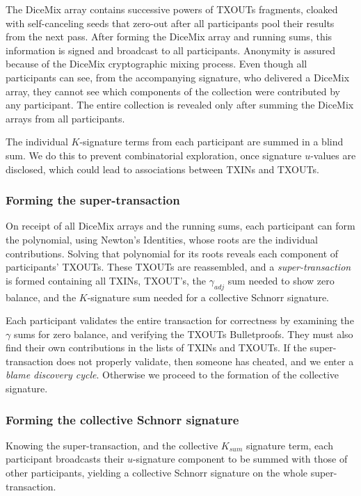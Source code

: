 \documentclass[a4paper, 10pt, conference]{ieeeconf}
\begin{document}
The DiceMix array contains successive powers of TXOUTs fragments, cloaked with self-canceling seeds that zero-out after all participants pool their results from the next pass. After forming the DiceMix array and running sums, this information is signed and broadcast to all participants. Anonymity is assured because of the DiceMix cryptographic mixing process. Even though all participants can see, from the accompanying signature, who delivered a DiceMix array, they cannot see which components of the collection were contributed by any participant. The entire collection is revealed only after summing the DiceMix arrays from all participants.

The individual $K$-signature terms from each participant are summed in a blind sum. We do this to prevent combinatorial exploration, once signature $u$-values are disclosed, which could lead to associations between TXINs and TXOUTs.

\subsubsection{Forming the super-transaction} 
On receipt of all DiceMix arrays and the running sums, each participant can form the polynomial, using Newton's Identities, whose roots are the individual contributions. Solving that polynomial for its roots reveals each component of participants' TXOUTs. These TXOUTs are reassembled, and a \textit{super-transaction} is formed containing all TXINs, TXOUT's, the $\gamma_{adj}$ sum needed to show zero balance, and the $K$-signature sum needed for a collective Schnorr signature.

Each participant validates the entire transaction for correctness by examining the $\gamma$ sums for zero balance, and verifying the TXOUTs Bulletproofs. They must also find their own contributions in the lists of TXINs and TXOUTs. If the super-transaction does not properly validate, then someone has cheated, and we enter a \textit{blame discovery cycle}. Otherwise we proceed to the formation of the collective signature. 

\subsubsection{Forming the collective Schnorr signature} 
Knowing the super-transaction, and the collective $K_{sum}$ signature term, each participant broadcasts their $u$-signature component to be summed with those of other participants, yielding a collective Schnorr signature on the whole super-transaction.
\end{document}
